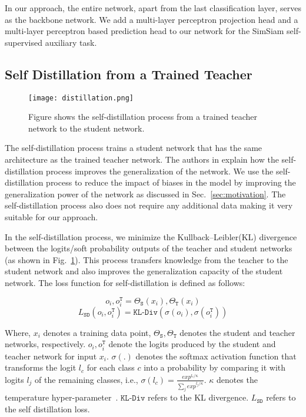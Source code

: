 \documentclass[10pt,twocolumn,letterpaper]{article}
\begin{document}
In our approach, the entire network, apart from the last classification layer, serves as the backbone network. We add a multi-layer perceptron projection head and a multi-layer perceptron based prediction head to our network for the SimSiam self-supervised auxiliary task.


\subsection{Self Distillation from a Trained Teacher}

\begin{figure}[t]
\centering
    \texttt{[image: distillation.png]}
\caption{Figure shows the self-distillation process from a trained teacher network to the student network. } 
\label{fig:distill}
\end{figure}

The self-distillation process trains a student network that has the same architecture as the trained teacher network. The authors in \cite{NEURIPS2020_2288f691} explain how the self-distillation process improves the generalization of the network. We use the self-distillation process to reduce the impact of biases in the model by improving the generalization power of the network as discussed in Sec.~\ref{sec:motivation}.  The self-distillation process also does not require any additional data making it very suitable for our approach. 


In the self-distillation process, we minimize the Kullback–Leibler(KL) divergence between the logits/soft probability outputs of the teacher and student networks (as shown in Fig.~\ref{fig:distill}). This process transfers knowledge from the teacher to the student network and also improves the generalization capacity of the student network. The loss function for self-distillation is defined as follows:

\begin{equation}
    o_i,o_i^{\texttt{T}} = \Theta_{\texttt{S}}(x_i), \Theta_{\texttt{T}}(x_i)
\end{equation}
\begin{equation}
    L_{\texttt{SD}}(o_i,o_i^{\texttt{T}}) =\texttt{KL-Div}(\sigma(o_i),\sigma(o_i^{\texttt{T}}))
\end{equation}

Where, $x_i$ denotes a training data point, $\Theta_{\texttt{S}},\Theta_{\texttt{T}}$ denotes the student and teacher networks, respectively. $o_i,o_i^{\texttt{T}}$ denote the logits produced by the student and teacher network for input $x_i$. $\sigma(.)$ denotes the softmax activation function that transforms the logit $l_c$ for each class $c$ into a probability by comparing it with logits $l_j$ of the remaining classes, i.e., $\sigma(l_c) = \frac{exp^{l_c/\kappa}}{\sum_j exp^{l_j/\kappa}}$. $\kappa$ denotes the temperature hyper-parameter~\cite{hinton2015distill}. $\texttt{KL-Div}$ refers to the KL divergence. $L_{\texttt{SD}}$ refers to the self distillation loss.
\end{document}

